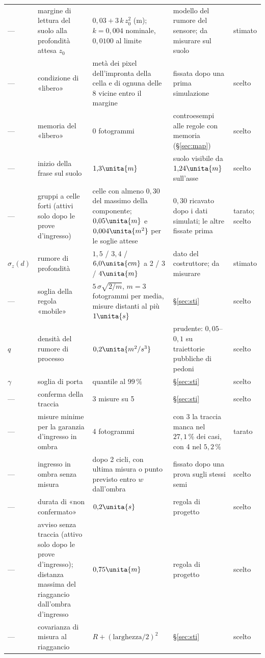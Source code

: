 \begin{table}[H]
\begin{tabularx}{\linewidth}{@{}p{1.25cm}Lp{3.5cm}Lp{1.2cm}@{}}
--- & margine di lettura del suolo alla profondità attesa $z_0$ & $0{,}03+3\,k\,z_0^2$ (m); $k=0{,}004$ nominale, $0{,}0100$ al limite & modello del rumore del sensore; da misurare sul suolo & stimato\\
--- & condizione di «libero» & metà dei pixel dell'impronta della cella e di ognuna delle 8 vicine entro il margine & fissata dopo una prima simulazione & scelto\\
--- & memoria del «libero» & 0 fotogrammi & controesempi alle regole con memoria (\S\ref{sec:map}) & scelto\\
--- & inizio della frase sul suolo & $1{,}3\unita{m}$ & suolo visibile da $1{,}24\unita{m}$ sull'asse & scelto\\
--- & gruppi a celle forti (attivi solo dopo le prove d'ingresso) & celle con almeno $0{,}30$ del massimo della componente; $0{,}05\unita{m}$ e $0{,}004\unita{m^2}$ per le soglie attese & $0{,}30$ ricavato dopo i dati simulati; le altre fissate prima & tarato; scelto\\
$\sigma_z(d)$ & rumore di profondità & $1{,}5$ / $3{,}4$ / $6{,}0\unita{cm}$ a 2 / 3 / $4\unita{m}$ & dato del costruttore; da misurare & stimato\\
--- & soglia della regola «mobile» & $5\,\sigma\sqrt{2/m}$, $m=3$ fotogrammi per media, misure distanti al più $1\unita{s}$ & \S\ref{sec:sti} & scelto\\
$q$ & densità del rumore di processo & $0{,}2\unita{m^2/s^3}$ & prudente: $0{,}05$--$0{,}1$ su traiettorie pubbliche di pedoni & scelto\\
$\gamma$ & soglia di porta & quantile al $99\,\%$ & \S\ref{sec:sti} & scelto\\
--- & conferma della traccia & 3 misure su 5 & \S\ref{sec:sti} & scelto\\
--- & misure minime per la garanzia d'ingresso in ombra & 4 fotogrammi & con 3 la traccia manca nel $27{,}1\,\%$ dei casi, con 4 nel $5{,}2\,\%$ & tarato\\
--- & ingresso in ombra senza misura & dopo 2 cicli, con ultima misura o punto previsto entro $w$ dall'ombra & fissato dopo una prova sugli stessi semi & scelto\\
--- & durata di «non confermato» & $0{,}2\unita{s}$ & regola di progetto & scelto\\
--- & avviso senza traccia (attivo solo dopo le prove d'ingresso); distanza massima del riaggancio dall'ombra d'ingresso & $0{,}75\unita{m}$ & regola di progetto & scelto\\
--- & covarianza di misura al riaggancio & $R+(\text{larghezza}/2)^2$ & \S\ref{sec:sti} & scelto\\
\bottomrule
\end{tabularx}
\end{table}

